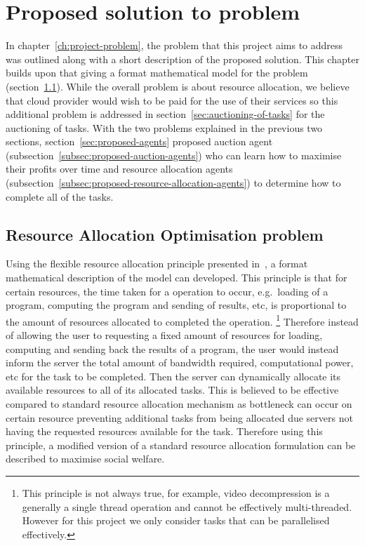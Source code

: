 \chapter{Proposed solution to problem}\label{ch:proposed-solution-to-problem}
In chapter~\ref{ch:project-problem}, the problem that this project aims to address was outlined along with a short
description of the proposed solution. This chapter builds upon that giving a format mathematical model for the problem
(section~\ref{sec:optimisation-problem}). While the overall problem is about resource allocation, we believe that cloud
provider would wish to be paid for the use of their services so this additional problem is addressed in
section~\ref{sec:auctioning-of-tasks} for the auctioning of tasks. With the two problems explained in the previous two
sections, section~\ref{sec:proposed-agents} proposed auction agent (subsection~\ref{subsec:proposed-auction-agents})
who can learn how to maximise their profits over time and resource allocation agents
(subsection~\ref{subsec:proposed-resource-allocation-agents}) to determine how to complete all of the tasks.

\section{Resource Allocation Optimisation problem}\label{sec:optimisation-problem}
Using the flexible resource allocation principle presented in~\cite{FlexibleResourceAllocation}, a format mathematical
description of the model can developed. This principle is that for certain resources, the time taken for a operation to
occur, e.g.\ loading of a program, computing the program and sending of results, etc, is proportional to the amount of
resources allocated to completed the operation. \footnote{This principle is not always true, for example, video
decompression is a generally a single thread operation and cannot be effectively multi-threaded. However for this
project we only consider tasks that can be parallelised effectively.}
Therefore instead of allowing the user to requesting a fixed amount of resources for loading, computing and sending back
the results of a program, the user would instead inform the server the total amount of bandwidth required,
computational power, etc for the task to be completed. Then the server can dynamically allocate its available resources
to all of its allocated tasks. This is believed to be effective compared to standard resource allocation mechanism as
bottleneck can occur on certain resource preventing additional tasks from being allocated due servers not
having the requested resources available for the task. Therefore using this principle, a modified version of a standard
resource allocation formulation can be described to maximise social welfare.

